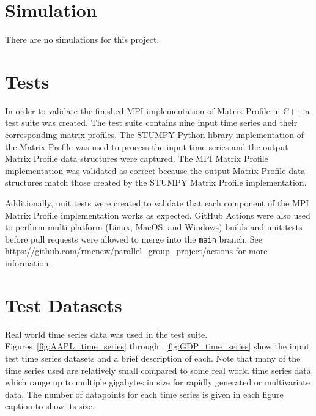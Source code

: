 \documentclass[conference]{IEEEtran}
\begin{document}
\section{Simulation}
There are no simulations for this project.

\section{Tests}
In order to validate the finished MPI implementation of Matrix Profile in C++ a test suite was created.  The test suite contains nine input time series and their corresponding matrix profiles.  The STUMPY\cite{Stumpy} Python library implementation of the Matrix Profile was used to process the input time series and the output Matrix Profile data structures were captured.  The MPI Matrix Profile implementation was validated as correct because the output Matrix Profile data structures match those created by the STUMPY Matrix Profile implementation. 

Additionally, unit tests were created to validate that each component of the MPI Matrix Profile implementation works as expected.  GitHub Actions were also used to perform multi-platform (Linux, MacOS, and Windows) builds and unit tests before pull requests were allowed to merge into the \texttt{main} branch.  See https://github.com/rmcnew/parallel\_group\_project/actions for more information.

\section{Test Datasets}
Real world time series data was used in the test suite.  Figures~\ref{fig:AAPL_time_series} through ~\ref{fig:GDP_time_series} show the input test time series datasets and a brief description of each.  Note that many of the time series used are relatively small compared to some real world time series data which range up to multiple gigabytes in size for rapidly generated or multivariate data.  The number of datapoints for each time series is given in each figure caption to show its size.
\end{document}
